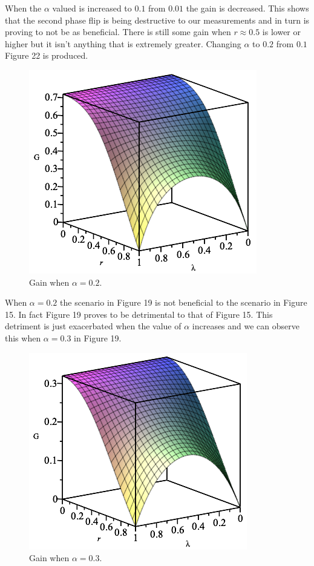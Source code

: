 \documentclass[twocolumn]{article}
\begin{document}
\newline
When the $\alpha$ valued is increased to $0.1$ from $0.01$ the gain is decreased. This shows that the second phase flip is being destructive to our measurements and in turn is proving to not be as beneficial. There is still some gain when $r\approx0.5$ is lower or higher but it isn't anything that is extremely greater. Changing $\alpha$ to $0.2$ from $0.1$ Figure 22 is produced.
\newpage
\begin{figure}[h]
\begin{center}
\includegraphics[width=0.65\linewidth]{Phase-Flip-Two-Channel-Alpha=02-Gain.png}
\caption{Gain when $\alpha=0.2$.}
\end{center}
\end{figure}
When $\alpha=0.2$ the scenario in Figure 19 is not beneficial to the scenario in Figure 15. In fact Figure 19 proves to be detrimental to that of Figure 15. This detriment is just exacerbated when the value of $\alpha$ increases and we can observe this when $\alpha=0.3$ in Figure 19.
\begin{figure}[h]
\begin{center}
\includegraphics[width=0.65\linewidth]{Phase-Flip-Two-Channel-Alpha=03-Gain.png}
\caption{Gain when $\alpha=0.3$.}
\end{center}
\end{figure}
\end{document}
